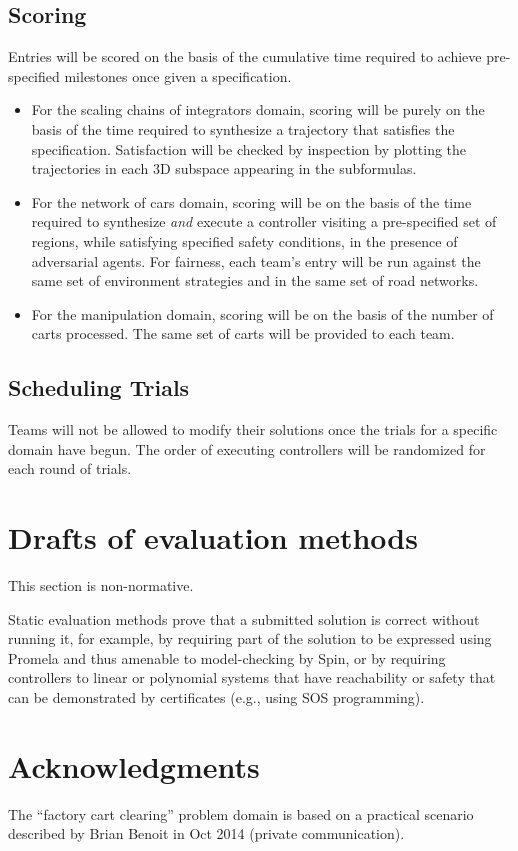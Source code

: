 \documentclass{amsart}
\theoremstyle{definition}
\begin{document}
\subsection{Scoring}
Entries will be scored on the basis of the cumulative time required to achieve pre-specified milestones once given a specification.

\begin{itemize}
\item For the scaling chains of integrators domain, scoring will be purely on the basis of the time required to synthesize a trajectory that 
satisfies the specification. Satisfaction will be checked by inspection by plotting the trajectories in each 3D subspace appearing in the
subformulas.
\item For the network of cars domain, scoring will be on the basis of the time required to synthesize \emph{and} execute a controller
visiting a pre-specified set of regions, while satisfying specified safety conditions, in the presence of adversarial agents. For fairness, 
each team's entry will be run against the same set of environment strategies and in the same set of road networks.
\item For the manipulation domain, scoring will be on the basis of the number of carts processed. The same set of carts will be provided 
to each team.
\end{itemize}


\subsection{Scheduling Trials}
Teams will not be allowed to modify their solutions once the trials for a specific domain have begun. The order of executing
controllers will be randomized for each round of trials.

\section{Drafts of evaluation methods}

This section is non-normative.\newline

Static evaluation methods prove that a submitted solution is correct without
running it, for example, by requiring part of the solution to be expressed using
Promela and thus amenable to model-checking by Spin, or by requiring controllers
to linear or polynomial systems that have reachability or safety that can be
demonstrated by certificates (e.g., using SOS programming).


\section*{Acknowledgments}

The ``factory cart clearing'' problem domain is based on a practical scenario
described by Brian Benoit in Oct 2014 (private communication).




\end{document}
